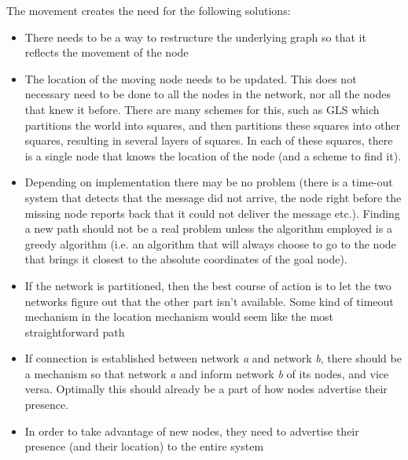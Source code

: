 \documentclass[letter, 12pt, english, draft]{article}
\begin{document}
The movement creates the need for the following solutions:
\begin{itemize}
\item There needs to be a way to restructure the underlying graph so that it reflects the movement of the node \cite{practical}
\item The location of the moving node needs to be updated. This does not necessary need to be done to all the nodes in the network, nor all the nodes that knew it before. There are many schemes for this, such as GLS \cite{scaleLocation} which partitions the world into squares, and then partitions these squares into other squares, resulting in several layers of squares. In each of these squares, there is a single node that knows the location of the node (and a scheme to find it).
\item Depending on implementation there may be no problem (there is a time-out system that detects that the message did not arrive, the node right before the missing node reports back that it could not deliver the message etc.). Finding a new path should not be a real problem unless the algorithm employed is a greedy algorithm (i.e. an algorithm that will always choose to go to the node that brings it closest to the absolute coordinates of the goal node).
\item If the network is partitioned, then the best course of action is to let the two networks figure out that the other part isn't available. Some kind of timeout mechanism in the location mechanism would seem like the most straightforward path
\item If connection is established between network \emph{a} and network \emph{b}, there should be a mechanism so that network \emph{a} and inform network \emph{b} of its nodes, and vice versa. Optimally this should already be a part of how nodes advertise their presence.
\item In order to take advantage of new nodes, they need to advertise their presence (and their location) to the entire system 
\end{itemize}


{}
\end{document}
